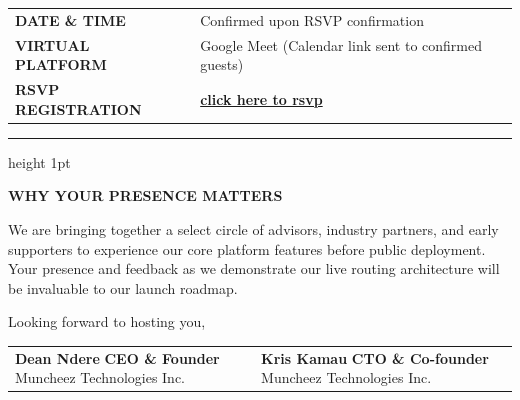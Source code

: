 \documentclass[11pt,a4paper]{article}
\begin{document}
\begin{tabularx}{\textwidth}{@{} p{4.5cm} X @{}}
    \textsf{\small\bfseries\color{CorporateNavy} DATE \& TIME} & 
    \textsf{\small\color{DeepCharcoal} Confirmed upon RSVP confirmation} \\[0.5cm]
    
    \textsf{\small\bfseries\color{CorporateNavy} VIRTUAL PLATFORM} & 
    \textsf{\small\color{DeepCharcoal} Google Meet (Calendar link sent to confirmed guests)} \\[0.5cm]
    
    \textsf{\small\bfseries\color{CorporateNavy} RSVP REGISTRATION} & 
    \textsf{\small\bfseries\color{LinkBlue}\href{https://muncheez-mu.vercel.app/}{click here to rsvp}} \\
\end{tabularx}

\vspace{0.4cm}
\color{RuleNavy}\hrule height 1pt
\vspace{0.8cm}

{\fontsize{13}{16}\sffamily\bfseries\color{CorporateNavy} WHY YOUR PRESENCE MATTERS}

\vspace{0.2cm}
\textsf{\small\color{DeepCharcoal} We are bringing together a select circle of advisors, industry partners, and early supporters to experience our core platform features before public deployment. Your presence and feedback as we demonstrate our live routing architecture will be invaluable to our launch roadmap.}

\vspace{0.8cm}

\textsf{\small\color{DeepCharcoal} Looking forward to hosting you,}

\vspace{0.6cm}

\begin{tabularx}{\textwidth}{@{} X X @{}}
    \textsf{\small\bfseries\color{CorporateNavy} Dean Ndere} \newline
    \textsf{\scriptsize\bfseries\color{LinkBlue} CEO \& Founder} \newline
    \textsf{\scriptsize\color{DeepCharcoal} Muncheez Technologies Inc.} &
    
    \textsf{\small\bfseries\color{CorporateNavy} Kris Kamau} \newline
    \textsf{\scriptsize\bfseries\color{LinkBlue} CTO \& Co-founder} \newline
    \textsf{\scriptsize\color{DeepCharcoal} Muncheez Technologies Inc.} \\
\end{tabularx}
\end{document}
